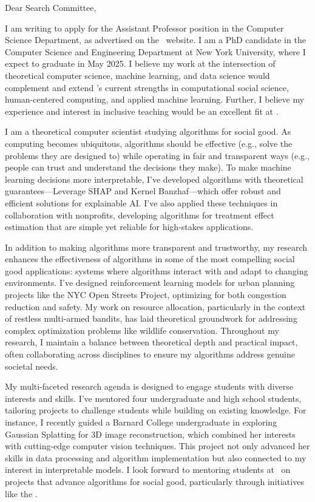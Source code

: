 \documentclass[11pt]{article}
\begin{document}
{\setlength{\parindent}{0cm}

Dear Search Committee,

I am writing to apply for the Assistant Professor position in the Computer Science Department, as advertised on the \school~website. I am a PhD candidate in the Computer Science and Engineering Department at New York University, where I expect to graduate in May 2025. I believe my work at the intersection of theoretical computer science, machine learning, and data science would complement and extend \school’s current strengths in computational social science, human-centered computing, and applied machine learning. Further, I believe my experience and interest in inclusive teaching would be an excellent fit at \school.

I am a theoretical computer scientist studying algorithms for social good. As computing becomes ubiquitous, algorithms should be effective (e.g., solve the problems they are designed to) while operating in fair and transparent ways (e.g., people can trust and understand the decisions they make). To make machine learning decisions more interpretable, I’ve developed algorithms with theoretical guarantees—Leverage SHAP and Kernel Banzhaf—which offer robust and efficient solutions for explainable AI. I’ve also applied these techniques in collaboration with nonprofits, developing algorithms for treatment effect estimation that are simple yet reliable for high-stakes applications.

In addition to making algorithms more transparent and trustworthy, my research enhances the effectiveness of algorithms in some of the most compelling social good applications: systems where algorithms interact with and adapt to changing environments. I’ve designed reinforcement learning models for urban planning projects like the NYC Open Streets Project, optimizing for both congestion reduction and safety. My work on resource allocation, particularly in the context of restless multi-armed bandits, has laid theoretical groundwork for addressing complex optimization problems like wildlife conservation. Throughout my research, I maintain a balance between theoretical depth and practical impact, often collaborating across disciplines to ensure my algorithms address genuine societal needs.

My multi-faceted research agenda is designed to engage students with diverse interests and skills. I've mentored four undergraduate and high school students, tailoring projects to challenge students while building on existing knowledge. For instance, I recently guided a Barnard College undergraduate in exploring Gaussian Splatting for 3D image reconstruction, which combined her interests with cutting-edge computer vision techniques. This project not only advanced her skills in data processing and algorithm implementation but also connected to my interest in interpretable models. I look forward to mentoring students at \school~on projects that advance algorithms for social good, particularly through initiatives like the \program.

}
\end{document}
